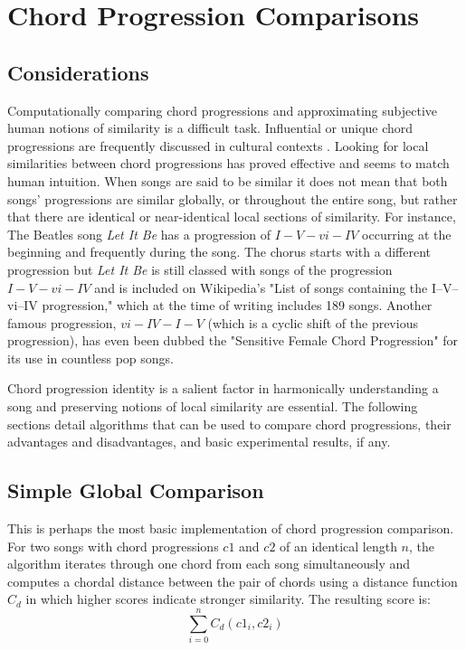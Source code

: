 \section{Chord Progression Comparisons}

\subsection{Considerations}

Computationally comparing chord progressions and approximating subjective human notions of similarity is a difficult task. Influential or unique chord progressions are frequently discussed in cultural contexts \cite{ogihara2008n}. Looking for local similarities between chord progressions has proved effective\cite{hanna2009alignment} and seems to match human intuition. When songs are said to be similar it does not mean that both songs' progressions are similar globally, or throughout the entire song, but rather that there are identical or near-identical local sections of similarity. For instance, The Beatles song \textit{Let It Be} has a progression of $I - V - vi - IV$ occurring at the beginning and frequently during the song. The chorus starts with a different progression but \textit{Let It Be} is still classed with songs of the progression $I - V - vi - IV$ and is included on Wikipedia's "List of songs containing the I–V–vi–IV progression," which at the time of writing includes 189 songs\cite{wikiprog1}. Another famous progression, $vi-IV-I-V$ (which is a cyclic shift of the previous progression), has even been dubbed the "Sensitive Female Chord Progression" for its use in countless pop songs\cite{hirsh2008}.

Chord progression identity is a salient factor in harmonically understanding a song and preserving notions of local similarity are essential. The following sections detail algorithms that can be used to compare chord progressions, their advantages and disadvantages, and basic experimental results, if any.

\subsection{Simple Global Comparison}

This is perhaps the most basic implementation of chord progression comparison. For two songs with chord progressions ${c1}$ and ${c2}$ of an identical length $n$, the algorithm iterates through one chord from each song simultaneously and computes a chordal distance between the pair of chords using a distance function $C_d$ in which higher scores indicate stronger similarity. The resulting score is: \[ \sum_{i=0}^n C_d({c1}_i, c2_i) \]

